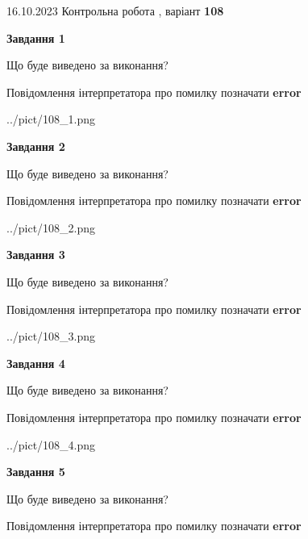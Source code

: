 \documentclass[12pt, ukrainian]{article}
\begin{document}
{\Large{16.10.2023 Контрольна робота , варіант  \No \textbf { 108 }\par}}
{
\begin {large}
{\begin {center}\textbf{Завдання 1}\end {center}}\par
Що буде виведено за виконання? \par
Повідомлення інтерпретатора про помилку позначати \textbf{error}

\begin{center}
	{../pict/108_1.png}
\end{center}
\newpage

{\begin {center}\textbf{Завдання 2}\end {center}}\par
Що буде виведено за виконання? \par
Повідомлення інтерпретатора про помилку позначати \textbf{error}

\begin{center}
	{../pict/108_2.png}
\end{center}
\newpage

{\begin {center}\textbf{Завдання 3}\end {center}}\par
Що буде виведено за виконання? \par
Повідомлення інтерпретатора про помилку позначати \textbf{error}

\begin{center}
	{../pict/108_3.png}
\end{center}
\newpage

{\begin {center}\textbf{Завдання 4}\end {center}}\par
Що буде виведено за виконання? \par
Повідомлення інтерпретатора про помилку позначати \textbf{error}

\begin{center}
	{../pict/108_4.png}
\end{center}
\newpage

{\begin {center}\textbf{Завдання 5}\end {center}}\par
Що буде виведено за виконання? \par
Повідомлення інтерпретатора про помилку позначати \textbf{error}


\end{large}}
\end{document}
